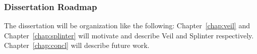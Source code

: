 \subsubsection{Dissertation Roadmap}

The dissertation will be organization like the following: 
Chapter~\ref{chap:veil} and Chapter~\ref{chap:splinter} will motivate and describe Veil
and Splinter respectively. Chapter~\ref{chap:concl} will describe future work.
